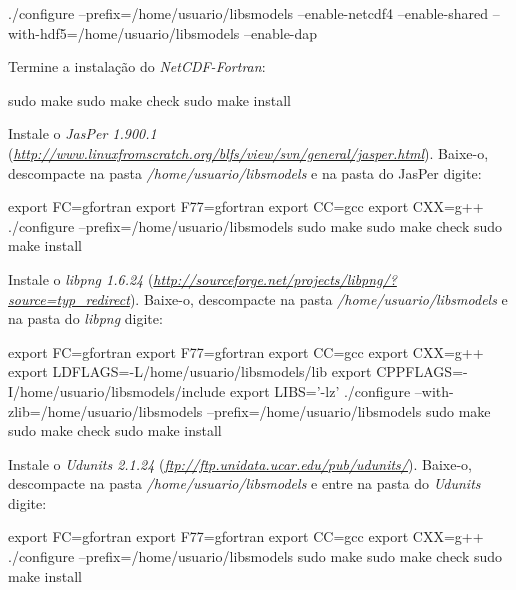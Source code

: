 \begin{bashcode}
./configure --prefix=/home/usuario/libsmodels --enable-netcdf4 --enable-shared
--with-hdf5=/home/usuario/libsmodels --enable-dap
\end{bashcode}
\bigskip

\noindent Termine a instalação do \textit{NetCDF-Fortran}:
\bigskip

\begin{bashcode}
sudo make
sudo make check
sudo make install
\end{bashcode}
\bigskip

\noindent Instale o \textit{JasPer 1.900.1} (\textcolor{bleu_cite}{\href{http://www.linuxfromscratch.org/blfs/view/svn/general/jasper.html}{\textit{http://www.linuxfromscratch.org/blfs/view/svn/general/jasper.html}}}). Baixe-o, descompacte na pasta \textit{/home/usuario/libsmodels} e na pasta do JasPer digite:
\bigskip

\begin{bashcode}
export FC=gfortran
export F77=gfortran
export CC=gcc
export CXX=g++
./configure --prefix=/home/usuario/libsmodels
sudo make
sudo make check
sudo make install
\end{bashcode}
\bigskip

\noindent Instale o \textit{libpng 1.6.24} (\textcolor{bleu_cite}{\href{http://sourceforge.net/projects/libpng/?source=typ\_redirect}{\textit{http://sourceforge.net/projects/libpng/?source=typ\_redirect}}}). Baixe-o, descompacte na pasta \textit{/home/usuario/libsmodels} e na pasta do \textit{libpng} digite:
\bigskip

\begin{bashcode}[fontsize=\scriptsize]
export FC=gfortran
export F77=gfortran
export CC=gcc
export CXX=g++
export LDFLAGS=-L/home/usuario/libsmodels/lib
export CPPFLAGS=-I/home/usuario/libsmodels/include
export LIBS='-lz'
./configure --with-zlib=/home/usuario/libsmodels --prefix=/home/usuario/libsmodels
sudo make
sudo make check
sudo make install
\end{bashcode}
\bigskip

\noindent Instale o \textit{Udunits 2.1.24} (\textcolor{bleu_cite}{\href{ftp://ftp.unidata.ucar.edu/pub/udunits/}{\textit{ftp://ftp.unidata.ucar.edu/pub/udunits/}}}).  Baixe-o, descompacte na pasta \textit{/home/usuario/libsmodels} e entre na pasta do \textit{Udunits} digite:
\bigskip

\begin{bashcode}
export FC=gfortran
export F77=gfortran
export CC=gcc
export CXX=g++
./configure --prefix=/home/usuario/libsmodels
sudo make
sudo make check
sudo make install
\end{bashcode}
\bigskip

